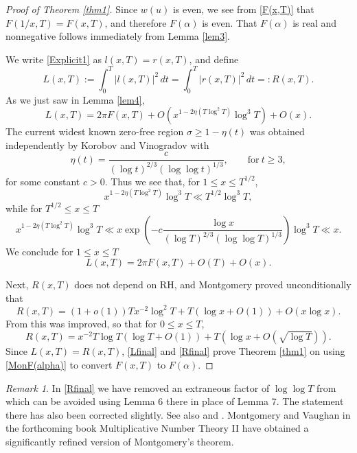 \documentclass{amsart}
\newcommand{\1}{\mathbbm{1}}
\theoremstyle{remark}
\newtheorem*{remark}{Remark}
\numberwithin{equation}{section}
\begin{document}
\begin{proof}[Proof of Theorem \ref{thm1}]
Since $w(u)$ is even, we see from \eqref{F(x,T)} that
$F(1/x,T) = F(x,T)$, and therefore $F(\alpha)$ is even. That $F(\alpha)$ is real and nonnegative follows immediately from Lemma \ref{lem3}.
 
We write \eqref{Explicit1} as $l(x,T)=r(x,T)$, and define
\begin{equation}\label{L=R} L(x,T) := \int_0^T\left|l(x,T)\right|^2\, dt = \int_0^T\left|r(x,T)\right|^2\, dt =: R(x,T). \end{equation}
As we just saw in Lemma \ref{lem4}, 
\[ L(x,T) = 2\pi F(x,T) +O(x^{1-2\eta(T\log^2 T)}\log^3T)+ O(x).\]
The current widest known zero-free region $\sigma \ge 1-\eta(t)$ was obtained independently by Korobov and Vinogradov with
\[ \eta(t) = \frac{c}{(\log{t})^{2/3}(\log\log{t})^{1/3}}, \qquad \text{for}~ t\ge3,\] 
for some constant $c>0$. Thus we see that, for $1\le x\le T^{1/2}$,
\[x^{1-2\eta(T\log^2 T)}\log^3T \ll T^{1/2}\log^3T,\]
while for $T^{1/2}\le x \le T$
\[x^{1-2\eta(T\log^2 T)}\log^3T \ll x \exp\left(-c\frac{\log x}{(\log{T})^{2/3}(\log\log{T})^{1/3}}\right)\log^3T \ll x. \] 
We conclude for $1\le x\le T$
\begin{equation}\label{Lfinal} L(x,T) = 2\pi F(x,T) + O(T) + O(x). \end{equation}

Next, $R(x,T)$ does not depend on RH, and Montgomery\cite{Montgomery73} proved unconditionally that 
\[ R(x,T) = (1+o(1)) T x^{-2} \log^2 T + T(\log x +O(1)) +O(x\log x). \]
From \cite{GM87} this was improved, so that for $0\le x\le T$,
\begin{equation}\label{Rfinal} R(x,T) = x^{-2} T\log T(\log T +O(1)) + T(\log x + O(\sqrt{\log T})). \end{equation}
Since $L(x,T)=R(x,T)$, \eqref{Lfinal} and \eqref{Rfinal} prove Theorem \ref{thm1} on using \eqref{MonF(alpha)} to convert $F(x,T)$ to $F(\alpha)$.
\end{proof}

\begin{remark}
In \eqref{Rfinal} we have removed an extraneous factor of $\log\log T$ from \cite{GM87} which can be avoided using Lemma 6 there in place of Lemma 7. The statement there has also been corrected slightly. See also \cite{Gold81} and \cite{LPZ17}. Montgomery and Vaughan in the forthcoming book Multiplicative Number Theory II have obtained a significantly refined version of {Montgomery's theorem}.
\end{remark}
\end{document}
